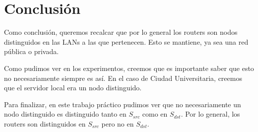 \documentclass[10pt, a4paper]{article}
\begin{document}
\section{Conclusión}
Como conclusión, queremos recalcar que por lo general los routers son nodos distinguidos en las LANs a las que pertenecen. Esto se mantiene, ya sea una red pública o privada.

Como pudimos ver en los experimentos, creemos que es importante saber que esto no necesariamente siempre es así. En el caso de Ciudad Universitaria, creemos que el servidor local era un nodo distinguido.

Para finalizar, en este trabajo práctico pudimos ver que no necesariamente un nodo distinguido es distinguido tanto en $S_{src}$ como en $S_{dst}$. Por lo general, los routers son distinguidos en $S_{src}$ pero no en $S_{dst}$.
\end{document}
